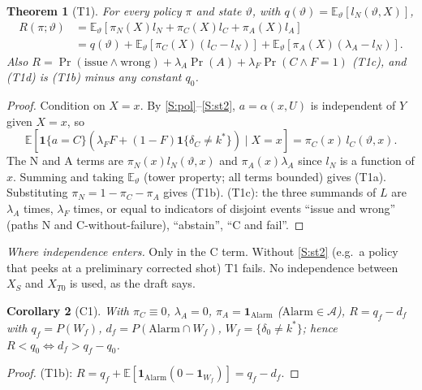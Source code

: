 \documentclass[11pt,a4paper]{article}
\newtheorem{theorem}{Theorem}
\newtheorem{corollary}[theorem]{Corollary}
\theoremstyle{definition}
\theoremstyle{remark}
\newcommand{\E}{\mathbb{E}}
\newcommand{\vt}{\vartheta}
\newcommand{\lA}{\lambda_A}
\newcommand{\lF}{\lambda_F}
\begin{document}
\begin{theorem}[T1]\label{thm:T1}
For every policy $\pi$ and state $\vt$, with $q(\vt)=\E_\vt[l_N(\vt,X)]$,
\begin{align*}
R(\pi;\vt)&=\E_\vt\!\left[\pi_N(X)l_N+\pi_C(X)l_C+\pi_A(X)l_A\right] \tag{T1a}\\
&=q(\vt)+\E_\vt[\pi_C(X)(l_C-l_N)]+\E_\vt[\pi_A(X)(\lA-l_N)]. \tag{T1b}
\end{align*}
Also $R=\Pr(\text{issue}\wedge\text{wrong})+\lA\Pr(A)+\lF\Pr(C\wedge F=1)$ (T1c), and
(T1d) is (T1b) minus any constant $q_0$.
\end{theorem}
\begin{proof}
Condition on $X=x$. By \ref{S:pol}--\ref{S:st2}, $a=\alpha(x,U)$ is independent of $Y$
given $X=x$, so
\[\E[\mathbf 1\{a=C\}(\lF F+(1-F)\mathbf 1\{\delta_C\neq k^*\})\mid X=x]
=\pi_C(x)\,l_C(\vt,x).\] The N and A terms are $\pi_N(x)l_N(\vt,x)$ and $\pi_A(x)\lA$
since $l_N$ is a function of $x$. Summing and taking $\E_\vt$ (tower property; all terms
bounded) gives (T1a). Substituting $\pi_N=1-\pi_C-\pi_A$ gives (T1b). (T1c): the three
summands of $L$ are $\lA$ times, $\lF$ times, or equal to indicators of disjoint events
``issue and wrong'' (paths N and C-without-failure), ``abstain'', ``C and fail''.
\end{proof}
\noindent\emph{Where independence enters.} Only in the C term. Without \ref{S:st2}
(e.g.\ a policy that peeks at a preliminary corrected shot) T1 fails. No independence
between $X_S$ and $X_{T0}$ is used, as the draft says.

\begin{corollary}[C1]
With $\pi_C\equiv0$, $\lA=0$, $\pi_A=\mathbf 1_{\mathrm{Alarm}}$ ($\mathrm{Alarm}\in\mathcal A$),
$R=q_f-d_f$ with $q_f=P(W_f)$, $d_f=P(\mathrm{Alarm}\cap W_f)$, $W_f=\{\delta_0\neq k^*\}$;
hence $R<q_0\iff d_f>q_f-q_0$.
\end{corollary}
\begin{proof}
(T1b): $R=q_f+\E[\mathbf 1_{\mathrm{Alarm}}(0-\mathbf 1_{W_f})]=q_f-d_f$.
\end{proof}
\end{document}
